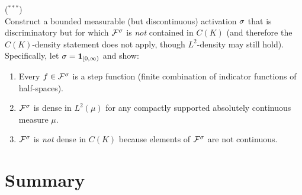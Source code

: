 \documentclass[11pt,a4paper]{article}
\begin{document}
\begin{exercise}
\textnormal{(\({}^{***}\))} \\
Construct a bounded measurable (but discontinuous) activation $\sigma$
that is discriminatory but for which $\mathcal{F}^{\sigma}$ is \emph{not}
contained in $C(K)$ (and therefore the $C(K)$-density statement does
not apply, though $L^2$-density may still hold).  Specifically, let
$\sigma = \mathbf{1}_{[0,\infty)}$ and show:
\begin{enumerate}[label=(\alph*)]
  \item Every $f \in \mathcal{F}^{\sigma}$ is a step function (finite
    combination of indicator functions of half-spaces).
  \item $\mathcal{F}^{\sigma}$ is dense in $L^2(\mu)$ for any
    compactly supported absolutely continuous measure $\mu$.
  \item $\mathcal{F}^{\sigma}$ is \emph{not} dense in $C(K)$ because
    elements of $\mathcal{F}^{\sigma}$ are not continuous.
\end{enumerate}
\end{exercise}

\section{Summary}
\label{sec:summary}
\end{document}
